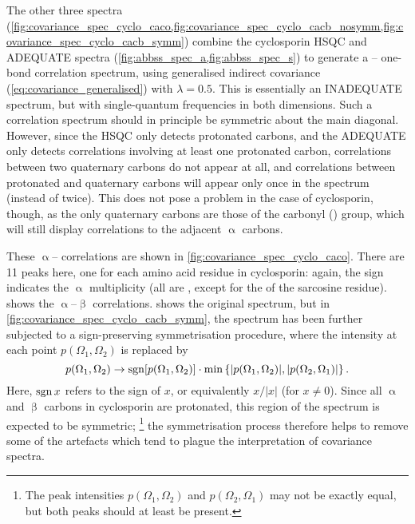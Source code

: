 The other three spectra (\cref{fig:covariance_spec_cyclo_caco,fig:covariance_spec_cyclo_cacb_nosymm,fig:covariance_spec_cyclo_cacb_symm}) combine the cyclosporin \carbon{} HSQC and ADEQUATE spectra (\cref{fig:abbss_spec_a,fig:abbss_spec_s}) to generate a \carbon{}--\carbon{} one-bond correlation spectrum, using generalised indirect covariance (\cref{eq:covariance_generalised}) with $\lambda = 0.5$.
This is essentially an INADEQUATE spectrum, but with single-quantum frequencies in both dimensions\autocite{Martin2011MRC,Martin2011MRC2}.
Such a correlation spectrum should in principle be symmetric about the main diagonal.
However, since the HSQC only detects protonated carbons, and the ADEQUATE only detects correlations involving at least one protonated carbon,
correlations between two quaternary carbons do not appear at all, and correlations between protonated and quaternary carbons will appear only once in the spectrum (instead of twice).
This does not pose a problem in the case of cyclosporin, though, as the only quaternary carbons are those of the carbonyl () group, which will still display correlations to the adjacent $\upalpha$ carbons.

These $\upalpha$-- correlations are shown in \cref{fig:covariance_spec_cyclo_caco}.
There are 11 peaks here, one for each amino acid residue in cyclosporin: again, the sign indicates the $\upalpha$ multiplicity (all are , except for the  of the sarcosine residue).
 shows the $\upalpha$--$\upbeta$ correlations.
 shows the original spectrum, but in \cref{fig:covariance_spec_cyclo_cacb_symm}, the spectrum has been further subjected to a sign-preserving symmetrisation procedure, where the intensity at each point $p(\Omega_1, \Omega_2)$ is replaced by
\begin{equation}
    \label{eq:covariance_symmetrisation}
    p(\Omega_1, \Omega_2) \to \operatorname*{sgn}[p(\Omega_1, \Omega_2)] \cdot \min\left\{|p(\Omega_1, \Omega_2)|, |p(\Omega_2, \Omega_1)|\right\}.
\end{equation}
Here, $\operatorname*{sgn}{x}$ refers to the sign of $x$, or equivalently $x / |x|$ (for $x \neq 0$).
Since all $\upalpha$ and $\upbeta$ carbons in cyclosporin are protonated, this region of the spectrum is expected to be symmetric;%
\footnote{The peak intensities $p(\Omega_1, \Omega_2)$ and $p(\Omega_2, \Omega_1)$ may not be exactly equal, but both peaks should at least be present.}
the symmetrisation process therefore helps to remove some of the artefacts which tend to plague the interpretation of covariance spectra.

